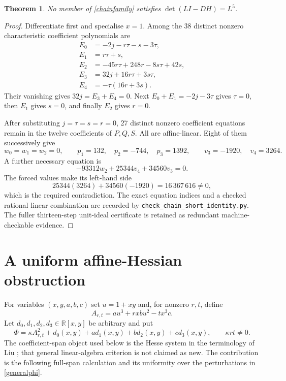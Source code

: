 \documentclass[11pt,a4paper]{article}
\newtheorem{theorem}{Theorem}[section]\newtheorem{proposition}[theorem]{Proposition}\newtheorem{corollary}[theorem]{Corollary}
\theoremstyle{remark}\newtheorem{remark}[theorem]{Remark}
\newcommand{\R}{\mathbb R}\newcommand{\Q}{\mathbb Q}\newcommand{\Id}{\operatorname{Id}}\newcommand{\tr}{\operatorname{tr}}\newcommand{\Hess}{\operatorname{Hess}}
\begin{document}
\begin{theorem}\label{chaintheorem}
No member of \eqref{chainfamily} satisfies $\det(LI-DH)=L^5$.
\end{theorem}
\begin{proof}
Differentiate first and specialise $x=1$. Among the 38 distinct nonzero
characteristic coefficient polynomials are
\begin{align*}
E_0&=-2j-r\tau-s-3\tau,\\
E_1&=r\tau+s,\\
E_2&=-45r\tau+248r-8s\tau+42s,\\
E_3&=32j+16r\tau+3s\tau,\\
E_4&=-\tau(16r+3s).
\end{align*}
Their vanishing gives $32j=E_3+E_4=0$. Next
$E_0+E_1=-2j-3\tau$ gives $\tau=0$, then $E_1$ gives $s=0$, and finally
$E_2$ gives $r=0$.

After substituting $j=\tau=s=r=0$, 27 distinct nonzero coefficient equations
remain in the twelve coefficients of $P,Q,S$.  All are affine-linear.  Eight of
them successively give
\[
w_0=w_1=w_2=0,\qquad
p_1=132,\quad p_2=-744,\quad p_3=1392,\qquad
v_3=-1920,\quad v_4=3264.
\]
A further necessary equation is
\[
-93312w_2+25344v_4+34560v_3=0.
\]
The forced values make its left-hand side
\[
25344(3264)+34560(-1920)=16\,367\,616\ne0,
\]
which is the required contradiction.  The exact equation indices and a checked
rational linear combination are recorded by
\texttt{check\_chain\_short\_identity.py}.  The fuller thirteen-step
unit-ideal certificate is retained as redundant machine-checkable evidence.
\end{proof}

\section{A uniform affine-Hessian obstruction}
For variables $(x,y,a,b,c)$ set $u=1+xy$ and, for nonzero $r,t$, define
\[
A_{r,t}=a u^3+rxb u^2-tx^3c.
\]
Let $d_0,d_1,d_2,d_3\in\R[x,y]$ be arbitrary and put
\begin{equation}\label{generalphi}
\Phi=\kappa A_{r,t}^2+d_0(x,y)+a d_1(x,y)+b d_2(x,y)+c d_3(x,y),
\qquad \kappa rt\ne0.
\end{equation}
The coefficient-span object used below is the Hesse system in the terminology
of Liu \cite{liu}; that general linear-algebra criterion is not claimed as new.
The contribution is the following full-span calculation and its uniformity over
the perturbations in \eqref{generalphi}.
\end{document}
